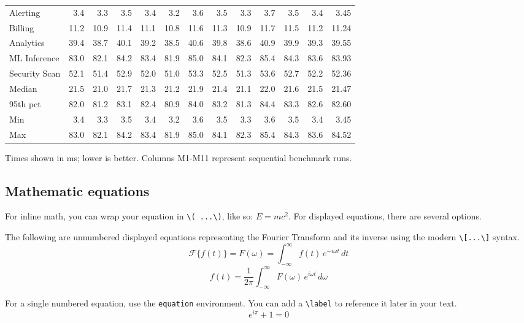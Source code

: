 \begin{table}
{\begin{tabular}{lrrrrrrrrrrrr}
      Alerting      & 3.4  & 3.3  & 3.5  & 3.4  & 3.2  & 3.6  & 3.5  & 3.3  & 3.7  & 3.5  & 3.4  & 3.45  \\
      Billing       & 11.2 & 10.9 & 11.4 & 11.1 & 10.8 & 11.6 & 11.3 & 10.9 & 11.7 & 11.5 & 11.2 & 11.24 \\
      Analytics     & 39.4 & 38.7 & 40.1 & 39.2 & 38.5 & 40.6 & 39.8 & 38.6 & 40.9 & 39.9 & 39.3 & 39.55 \\
      ML Inference  & 83.0 & 82.1 & 84.2 & 83.4 & 81.9 & 85.0 & 84.1 & 82.3 & 85.4 & 84.3 & 83.6 & 83.93 \\
      Security Scan & 52.1 & 51.4 & 52.9 & 52.0 & 51.0 & 53.3 & 52.5 & 51.3 & 53.6 & 52.7 & 52.2 & 52.36 \\
      \midrule
      Median        & 21.5 & 21.0 & 21.7 & 21.3 & 21.2 & 21.9 & 21.4 & 21.1 & 22.0 & 21.6 & 21.5 & 21.47 \\
      95th pct      & 82.0 & 81.2 & 83.1 & 82.4 & 80.9 & 84.0 & 83.2 & 81.3 & 84.4 & 83.3 & 82.6 & 82.60 \\
      Min           & 3.4  & 3.3  & 3.5  & 3.4  & 3.2  & 3.6  & 3.5  & 3.3  & 3.6  & 3.5  & 3.4  & 3.45  \\
      Max           & 83.0 & 82.1 & 84.2 & 83.4 & 81.9 & 85.0 & 84.1 & 82.3 & 85.4 & 84.3 & 83.6 & 84.52 \\
      \bottomrule
    \end{tabular}%
  }
  \vspace{10pt}

  \footnotesize Times shown in ms; lower is better. Columns M1-M11 represent sequential benchmark runs.
\end{table}
\subsection{Mathematic equations}
For inline math, you can wrap your equation in \texttt{\textbackslash( ...\textbackslash)}, like so: \(E=mc^2\). For displayed equations, there are several options.

The following are unnumbered displayed equations representing the Fourier Transform and its inverse using the modern \texttt{\textbackslash[...\textbackslash]} syntax.
\[
  \mathcal{F}\{f(t)\}=F(\omega)=\int_{-\infty}^{\infty} f(t)\,e^{-i\omega t}\,dt
\]
\[
  f(t)=\frac{1}{2\pi}\int_{-\infty}^{\infty} F(\omega)\,e^{i\omega t}\,d\omega
\]

For a single numbered equation, use the \texttt{equation} environment. You can add a \texttt{\textbackslash label} to reference it later in your text.
\begin{equation}
  \label{eq:euler}
  e^{i\pi} + 1 = 0
\end{equation}


